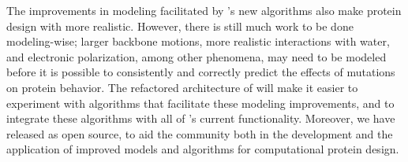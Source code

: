 The improvements in modeling facilitated by 's new algorithms also make protein design with \osprey more realistic.  However, there is still much work to be done modeling-wise; larger backbone motions, more realistic interactions with water, and electronic polarization, among other phenomena, may need to be modeled before it is possible to consistently and correctly predict the effects of mutations on protein behavior.  The refactored architecture of  will make it easier to experiment with algorithms that facilitate these modeling improvements, and to integrate these algorithms with all of \osprey's current functionality.  Moreover, we have released  as open source, to aid the community both in the development and the application of improved models and algorithms for computational protein design.  


